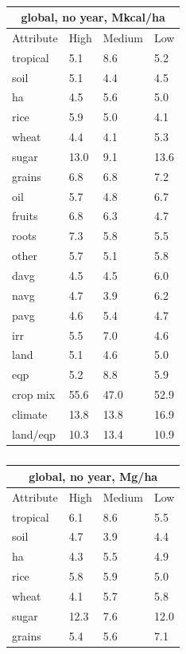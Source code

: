 \documentclass[12pt]{article}
\begin{document}
\begin{table}[h!]
\parbox{.45\linewidth} {
\centering
\begin{tabular}{llll}
\toprule
\multicolumn{4}{c}{\textbf{global, no year, Mkcal/ha}} \\
\midrule
Attribute & High & Medium & Low \\
\midrule
tropical & 5.1 & 8.6 & 5.2 \\
soil & 5.1 & 4.4 & 4.5 \\
ha & 4.5 & 5.6 & 5.0 \\
rice & 5.9 & 5.0 & 4.1 \\
wheat & 4.4 & 4.1 & 5.3 \\
sugar & 13.0 & 9.1 & 13.6 \\
grains & 6.8 & 6.8 & 7.2 \\
oil & 5.7 & 4.8 & 6.7 \\
fruits & 6.8 & 6.3 & 4.7 \\
roots & 7.3 & 5.8 & 5.5 \\
other & 5.7 & 5.1 & 5.8 \\
davg & 4.5 & 4.5 & 6.0 \\
navg & 4.7 & 3.9 & 6.2 \\
pavg & 4.6 & 5.4 & 4.7 \\
irr & 5.5 & 7.0 & 4.6 \\
land & 5.1 & 4.6 & 5.0 \\
eqp & 5.2 & 8.8 & 5.9 \\
\midrule
crop mix & 55.6 & 47.0 & 52.9 \\
climate & 13.8 & 13.8 & 16.9 \\
land/eqp & 10.3 & 13.4 & 10.9 \\
\bottomrule
\end{tabular}
\caption{ }
\label{k.ny.wt_percentages}
}
\parbox{.45\linewidth} {
\centering
\begin{tabular}{llll}
\toprule
\multicolumn{4}{c}{\textbf{global, no year, Mg/ha}} \\
\midrule
Attribute & High & Medium & Low \\
\midrule
tropical & 6.1 & 8.6 & 5.5 \\
soil & 4.7 & 3.9 & 4.4 \\
ha & 4.3 & 5.5 & 4.9 \\
rice & 5.8 & 5.9 & 5.0 \\
wheat & 4.1 & 5.7 & 5.8 \\
sugar & 12.3 & 7.6 & 12.0 \\
grains & 5.4 & 5.6 & 7.1 \\

\end{tabular}}
\end{table}
\end{document}
